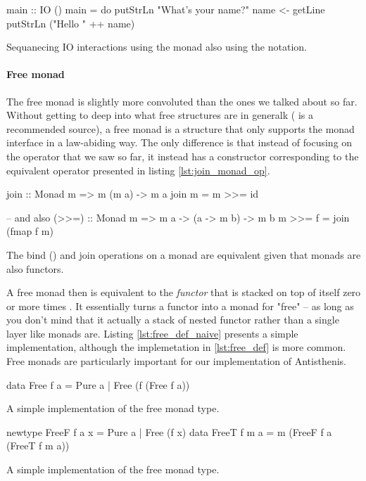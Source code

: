   \begin{code}
\begin{haskellcode}
main :: IO ()
main = do
  putStrLn "What's your name?"
  name <- getLine
  putStrLn ("Hello " ++ name)
\end{haskellcode}
    \caption{\label{lst:io_sugar_example}Sequanecing IO interactions
      using the  monad also using the  notation.}
  \end{code}

  \paragraph{Free monad}

  The free monad is slightly more convoluted than the ones we talked
  about so far. Without getting to deep into what free structures are in
  generalk (\cite{bartoszmilewskiDaoFunctionalProgramming} is a
  recommended source), a free monad is a structure that only supports
  the monad interface in a law-abiding way. The only difference is that
  instead of focusing on the \hask{>>=} operator that we saw so far, it
  instead has a constructor corresponding to the equivalent operator
   presented in listing \ref{lst:join_monad_op}.

  \begin{code}
\begin{haskellcode}
join :: Monad m => m (m a) -> m a
join m = m >>= id

-- and also
(>>=) :: Monad m => m a -> (a -> m b) -> m b
m >>= f = join (fmap f m)
\end{haskellcode}

    \caption{\label{lst:join_monad_op}The bind (\hask{>>=}) and join
      operations on a monad are equivalent given that monads are also
      functors.}
  \end{code}

  A free monad  then is equivalent to the \emph{functor}
   that is stacked on top of itself zero or more times . It essentially turns a functor into a monad for
  "free" -- as long as you don't mind that it actually a stack of nested
  functor rather than a single layer like monads are. Listing
  \ref{lst:free_def_naive} presents a simple implementation, although
  the implemetation in \ref{lst:free_def} is more common. Free monads
  are particularly important for our implementation of Antisthenis.

  \begin{code}
\begin{haskellcode}
data Free f a
  = Pure a
  | Free (f (Free f a))
\end{haskellcode}
    \caption{\label{lst:free_def_naive}A simple implementation of the free
      monad type.}
  \end{code}

  \begin{code}
\begin{haskellcode}
newtype FreeF f a x = Pure a | Free (f x)
data FreeT f m a = m (FreeF f a (FreeT f m a))
\end{haskellcode}
    \caption{\label{lst:free_def}A simple implementation of the free
      monad type.}
  \end{code}
